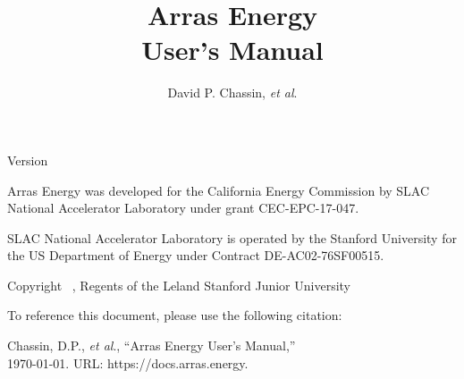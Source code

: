 \documentclass{article}
\title
{
	\LARGE Arras Energy
\\
	User's Manual
}
\author {
	David P. Chassin, \textit{et al}.
}
\begin{document}
\maketitle

\begin{center}

Version 

\vspace{0.5in}

Arras Energy was developed for the California Energy Commission by SLAC National Accelerator Laboratory under grant CEC-EPC-17-047.

\vspace{0.5in}

SLAC National Accelerator Laboratory is operated by the Stanford University for the US Department of Energy under Contract DE-AC02-76SF00515.

\vspace{0.5in}

Copyright \textcopyright~\the\year, Regents of the Leland Stanford Junior University

\vspace{0.5in}

To reference this document, please use the following citation:

Chassin, D.P., \textit{et al}., ``Arras Energy User's Manual,''\\\today. URL: https://docs.arras.energy.

\end{center}


\end{document}
